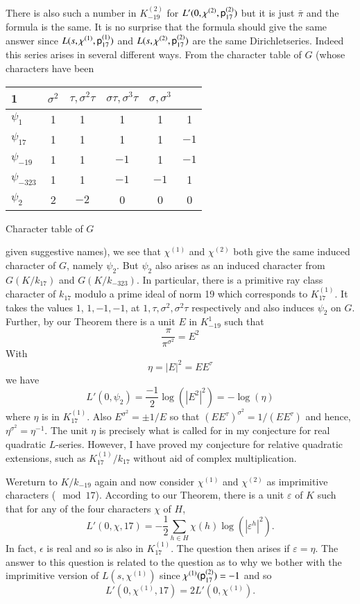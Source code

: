 There is also such a number in $K^{(2)}_{-19}$ for $L' (0, \chi^{(2)}, \mathsf{p}^{(2)}_{17})$ but it is just $\bar{\pi}$ and the formula is the same. It is no surprise that the formula should give the same answer since $L(s, \chi^{(1)}, \mathsf{p}^{(1)}_{17})$ and $L(s, \chi^{(2)}, \mathsf{p}^{(2)}_{17})$ are the same Dirichlet\pageoriginale series. Indeed this series arises in several different ways. From the character table of $G$ (whose characters have been
\begin{center}
{\renewcommand{\arraystretch}{1.2}
\tabcolsep=12pt
\begin{tabular}{l|c|c|c|c|c}
\hline
1 & $\sigma^2$ & $\tau, \sigma^2 \tau$ & $\sigma \tau, \sigma^3 \tau$ & $\sigma, \sigma^3$\\
\hline
$\psi_1$ & 1&1&1&1&1\\
\hline
$\psi_{17}$ & 1&1&1&1&$-1$\\
\hline
$\psi_{-19}$ & 1&1&$-1$&1&$-1$\\
\hline
$\psi_{-323}$ & 1&1&$-1$&$-1$&1\\
\hline
$\psi_2$ & 2&$-2$&0&0&0\\
\hline
\end{tabular}}

\smallskip
Character table of $G$
\end{center}
given suggestive names), we see that $\chi^{(1)}$ and $\chi^{(2)}$ both give the same induced character of $G$, namely $\psi_2$. But $\psi_2$ also arises as an induced character from $G(K/k_{17})$ and $G(K/k_{-323})$. In particular, there is a primitive ray class character of $k_{17}$ modulo a prime ideal of norm 19 which corresponds to $K^{(1)}_{17}$. It takes the values $1$, $1, -1, -1$, at $1, \tau, \sigma^2, \sigma^2 \tau$ respectively and also induces $\psi_2$ on $G$. Further, by our Theorem there is a unit $E$ in $K^1_{-19}$ such that 
$$
\frac{\pi}{\pi^{\sigma^2}} = E^2
$$
With 
$$
\eta = |E|^2 = EE^\tau
$$
we have 
$$
L' (0, \psi_2) = \frac{-1}{2} \log (|E^2|^2) = - \log (\eta)
$$
where $\eta$ is in $K^{(1)}_{17}$. Also $E^{\sigma^2} = \pm 1/E$ so that $(E E^\tau)^{\sigma^2} = 1 /(EE^\tau)$ and hence, $\eta^{\sigma^2} = \eta^{-1}$. The unit $\eta$ is precisely what is called for in my conjecture for real quadratic $L$-series. However, I have proved my conjecture for relative quadratic extensions, such as $K^{(1)}_{17}/k_{17}$ without aid of complex multiplication.

We\pageoriginale return to $K/k_{-19}$ again and now consider $\chi^{(1)}$ and $\chi^{(2)}$ as imprimitive characters ($\mod 17$). According to our Theorem, there is a unit $\varepsilon$ of $K$ such that for any of the four characters $\chi$ of $H$,
$$
L' (0, \chi, 17) = - \frac{1}{2} \sum\limits_{h \in H} \chi (h) \log (|\varepsilon^h|^2).
$$
In fact, $\epsilon$ is real and so is also in $K^{(1)}_{17}$. The question then arises if $\varepsilon = \eta$. The answer to this question is related to the question as to why we bother with the imprimitive version of $L(s, \chi^{(1)})$ since $\chi^{(1)} (\mathsf{p}_{17}^{(2)}) = -1$ and so 
$$
L' (0, \chi^{(1)}, 17) = 2 L' (0, \chi^{(1)}). 
$$

